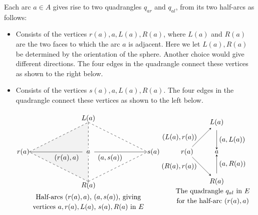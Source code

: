 \documentclass[12pt]{amsart}
\theoremstyle{definition}
\theoremstyle{remark}
\numberwithin{equation}{section}
\begin{document}
\noindent 
Each arc $a \in A$ gives rise to two quadrangles $q_{ar}$ and $q_{al}$, from its two half-arcs as follows: 
\begin{itemize}
\item[$q_{ar}$:] Consists of the vertices $r(a), a , L(a), R(a)$, where $L(a)$ and $R(a)$ are the two faces to which the arc $a$ is adjacent. Here we let  $L(a), R(a)$ be determined by the orientation of the sphere. Another choice would give different directions. The four edges in the quadrangle connect these vertices as shown to the right below.  
\item[$q_{al}$:] Consists of the vertices $s(a), a, L(a), R(a)$. The four edges in the quadrangle connect these vertices as shown to the left below.
\end{itemize}
\begin{equation} \label{eq:half-arcs}
\begin{array}{ll}
&\begin{tikzpicture}

\filldraw[fill=gray!10,dashed] (0,-1.5)--(-3,0)--(0,1.5);

\node at (0,0) {\tiny $a$};
\node at (3.3,0) {\tiny $s(a)$};
\node at (-3.3,0) {\tiny $r(a)$};
\node at (0,1.7) {\tiny $L(a)$};
\node at (0,-1.7) {\tiny $R(a)$};
\node at (0,-2.3) {Half-arcs $(r(a),a)$, $(a,s(a))$, giving};
\node at (0,-2.8) {vertices $a,r(a),L(a)$, $s(a),R(a)$ in $E$};


\draw (-3,0) -- (-0.3,0);
\draw(0.3,0) -- (3,0);
\node at (-1.1,-0.3) {\tiny $(r(a),a)$};
\node at (1.1,-0.3) {\tiny $(a,s(a))$};

\draw[dashed] (0,1.5) -- (0,0.2);
\draw[dashed](0,-1.5) -- (0,-0.2);
\draw[dashed] (0,1.5) -- (3,0);
\draw[dashed] (0,-1.5) -- (3,0);

\begin{scope}[xshift=6.5cm]
\node at (-0.2,-2) {\text{The quadrangle $q_{a l}$ in $E$}};
\node at (-0.2,-2.5) {\text{for the half-arc $(r(a),a)$}};
\node at (0,-3) { };
\node[circle, inner sep=0pt] (t) at (0,1.5) {\small $L(a)$};
\node[circle, inner sep=0pt] (l) at (0,0) {\small $a$};
\node[circle, inner sep=0pt] (n) at (-1.5,0) {\small $r(a)$};
\node[circle, inner sep=0pt] (b) at (0,-1.5) {\small $R(a)$};
\draw[-stealth] (t)--(l) node[inner sep=0pt, pos=0.5, right] {\small $\ (a,L(a))  $};
\draw[-stealth] (n)--(t) node[inner sep=0pt, pos=0.5, left] {\small $(L(a),r(a)) \ \ $};
\draw[-stealth] (b)--(l) node[inner sep=0pt, pos=0.5, right] {\small $\ (a,R(a))  $};
\draw[-stealth] (n)--(b) node[inner sep=0pt, pos=0.5, left] {\small $(R(a),r(a)) \ \ $};


\end{scope}
\end{tikzpicture}
\end{array}
\end{equation}
\end{document}
